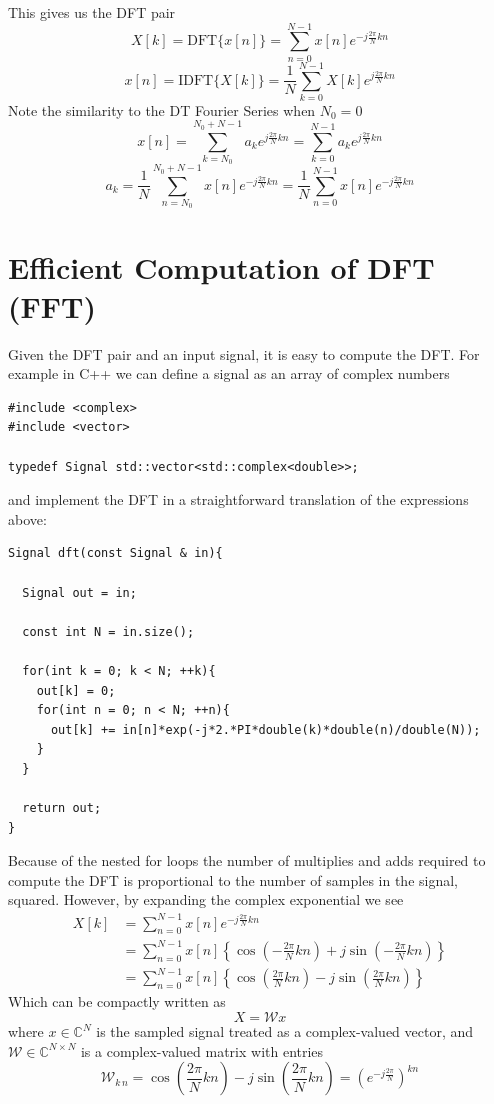 This gives us the DFT pair
\[
X[k] = \text{DFT} \{ x[n] \} = \sum_{n = 0}^{N-1}  x[n] e^{-j \frac{2\pi}{N}k n}
\]
\[
x[n] = \text{IDFT} \{ X[k] \} = \frac{1}{N} \sum_{k = 0}^{N-1}  X[k] e^{j \frac{2\pi}{N}k n}
\]
Note the similarity to the DT Fourier Series when $N_0 = 0$
\[
x[n] = \sum\limits_{k = N_0}^{N_0 + N - 1} a_k e^{j\frac{2\pi}{N}kn} =  \sum\limits_{k = 0}^{N - 1} a_k e^{j\frac{2\pi}{N}kn}
\]
\[
a_k = \frac{1}{N}\sum\limits_{n = N_0}^{N_0 + N - 1} x[n] e^{-j\frac{2\pi}{N}kn} =  \frac{1}{N}\sum\limits_{n = 0}^{N - 1} x[n] e^{-j\frac{2\pi}{N}kn}
\]

\section{Efficient Computation of DFT (FFT)}

Given the DFT pair and an input signal, it is easy to compute the DFT. For example in C++ we can define a signal as an array of complex numbers

\begin{verbatim}
#include <complex>
#include <vector>

typedef Signal std::vector<std::complex<double>>;
\end{verbatim}

and implement the DFT in a straightforward translation of the expressions above:

\begin{verbatim}
Signal dft(const Signal & in){

  Signal out = in;
  
  const int N = in.size();

  for(int k = 0; k < N; ++k){
    out[k] = 0;
    for(int n = 0; n < N; ++n){
      out[k] += in[n]*exp(-j*2.*PI*double(k)*double(n)/double(N));
    }
  }

  return out;
}
\end{verbatim}

Because of the nested for loops the number of multiplies and adds required to compute the DFT is proportional to the number of samples in the signal, squared. However, by expanding the complex exponential we see
\begin{align*}
  X[k] &= \sum_{n = 0}^{N-1}  x[n] e^{-j \frac{2\pi}{N}k n}\\
  &= \sum_{n = 0}^{N-1}  x[n] \left\{ \cos\left( -\frac{2\pi}{N}k n\right) + j \sin\left(-\frac{2\pi}{N}k n \right)\right\}\\
  &= \sum_{n = 0}^{N-1}  x[n] \left\{ \cos\left( \frac{2\pi}{N}k n\right) - j \sin\left(\frac{2\pi}{N}k n \right)\right\}
\end{align*}
Which can be compactly written as
\[
X = \mathcal{W} x
\]
where $x \in \mathbb{C}^N$ is the sampled signal treated as a complex-valued vector, and $\mathcal{W} \in \mathbb{C}^{N\times N}$ is a complex-valued matrix with entries
\[
\mathcal{W}_{k\,n} = \cos\left( \frac{2\pi}{N}k n\right) - j \sin\left(\frac{2\pi}{N}k n \right) = \left( e^{-j\frac{2\pi}{N}}\right)^{kn}
\]  

